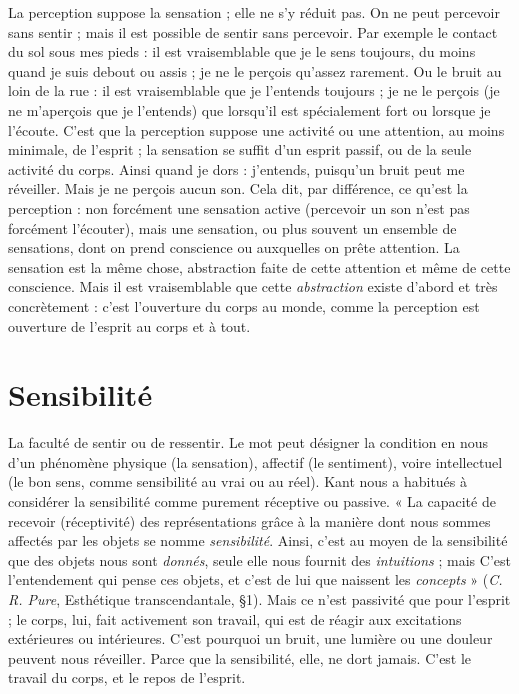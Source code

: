 La perception suppose la sensation ; elle ne s’y réduit pas. On ne peut percevoir
sans sentir ; mais il est possible de sentir sans percevoir. Par exemple le
contact du sol sous mes pieds : il est vraisemblable que je le sens toujours, du
moins quand je suis debout ou assis ; je ne le perçois qu’assez rarement. Ou le
bruit au loin de la rue : il est vraisemblable que je l’entends toujours ; je ne le
perçois (je ne m'aperçois que je l’entends) que lorsqu'il est spécialement fort ou
lorsque je l'écoute. C’est que la perception suppose une activité ou une attention,
au moins minimale, de l'esprit ; la sensation se suffit d’un esprit passif, ou
de la seule activité du corps. Ainsi quand je dors : j'entends, puisqu’un bruit
peut me réveiller. Mais je ne perçois aucun son. Cela dit, par différence, ce
qu'est la perception : non forcément une sensation active (percevoir un son
n'est pas forcément l’écouter), mais une sensation, ou plus souvent un
ensemble de sensations, dont on prend conscience ou auxquelles on prête
attention. La sensation est la même chose, abstraction faite de cette attention et
même de cette conscience. Mais il est vraisemblable que cette {\it abstraction} existe
d’abord et très concrètement : c’est l’ouverture du corps au monde, comme la
perception est ouverture de l’esprit au corps et à tout.

\section{Sensibilité}
La faculté de sentir ou de ressentir. Le mot peut désigner la
condition en nous d’un phénomène physique (la sensation),
affectif (le sentiment), voire intellectuel (le bon sens, comme sensibilité au vrai
ou au réel). Kant nous a habitués à considérer la sensibilité comme purement
réceptive ou passive. « La capacité de recevoir (réceptivité) des représentations
grâce à la manière dont nous sommes affectés par les objets se nomme {\it sensibilité}.
Ainsi, c’est au moyen de la sensibilité que des objets nous sont {\it donnés}, seule
elle nous fournit des {\it intuitions} ; mais C’est l’entendement qui pense ces objets,
et c'est de lui que naissent les {\it concepts} » ({\it C. R. Pure}, Esthétique transcendantale,
\S 1). Mais ce n’est passivité que pour l'esprit ; le corps, lui, fait activement son
travail, qui est de réagir aux excitations extérieures ou intérieures. C’est pourquoi
un bruit, une lumière ou une douleur peuvent nous réveiller. Parce que la
sensibilité, elle, ne dort jamais. C’est le travail du corps, et le repos de l'esprit.

